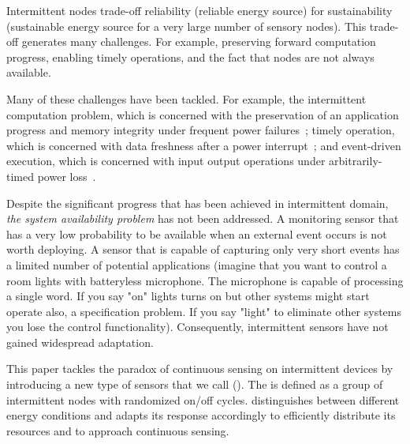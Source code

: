 Intermittent nodes trade-off reliability (reliable energy source) for sustainability (sustainable energy source for a very large number of sensory nodes). This trade-off generates many challenges. For example, preserving forward computation progress, enabling timely operations, and the fact that nodes are not always available. 
%

Many of these challenges have been tackled. For example, the intermittent computation problem, which is concerned with the preservation of an application progress and memory integrity under frequent power failures~\cite{mementos,dino,colin2016chain}; timely operation, which is concerned with data freshness after a power interrupt~\cite{hester2017timely}; and event-driven execution, which is concerned with input output operations under arbitrarily-timed power loss~\cite{yildirm2018ink}.%

Despite the significant progress that has been achieved in intermittent domain, \textit{the system availability problem} has not been addressed. A monitoring sensor that has a very low probability to be available when an external event occurs is not worth deploying. A sensor that is capable of capturing only very short events has a limited number of potential applications (imagine that you want to control a room lights with batteryless microphone. The microphone is capable of processing a single word. If you say "on" lights turns on but other systems might start operate also, a specification problem. If you say "light" to eliminate other systems you lose the control functionality). Consequently, intermittent sensors have not gained widespread adaptation. 

This paper tackles the paradox of continuous sensing on intermittent devices by introducing a new type of sensors that we call \textit{\fullsys} (\sys). The \sys is defined as a group of intermittent nodes with randomized on/off cycles. \sys distinguishes between different energy conditions and adapts its response accordingly to efficiently distribute its resources and to approach continuous sensing.  

